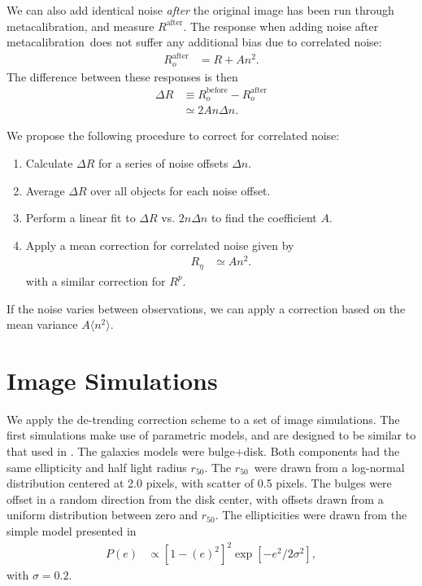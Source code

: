\documentclass[usegraphicx,usenatbib]{mn2e}
\newcommand{\hlr}{$r_{50}$}
\newcommand{\mcal}{metacalibration}
\newcommand{\mcalRpsf}{$R^{p}$}
\newcommand{\mcalRnoise}{$R_\eta$}
\begin{document}
We can also add identical noise {\em after} the original image  has been run
through \mcal, and measure $R^{\mathrm{after}}$.  The response when adding
noise after \mcal\ does not suffer any additional bias due to correlated noise:
\begin{align}
    R_o^{\mathrm{after}} &= R + A n^2.
\end{align}
The difference between these responses is then 
\begin{align}
    \Delta R &\equiv R_o^{\mathrm{before}} - R_o^{\mathrm{after}}  \nonumber \\
             &\simeq 2 A n \Delta n.
\end{align}

We propose the following procedure to correct for correlated noise:
\begin{enumerate}
    \item Calculate $\Delta R$ for a series of noise offsets $\Delta n$.
    \item Average $\Delta R$ over all objects for each noise offset.
    \item Perform a linear fit to $\Delta R$ vs. $2 n \Delta n$ to find the 
        coefficient $A$.
    \item Apply a mean correction for correlated noise given by
        \begin{align}
            \mbox{\mcalRnoise} & \simeq A n^2.
        \end{align}
        with a similar correction for \mcalRpsf.
\end{enumerate}
If the noise varies between observations, we can apply a 
correction based on the mean variance $A
\langle n^2 \rangle$.


\section{Image Simulations} \label{sec:sims}

We apply the de-trending correction scheme to a set of image simulations.  The
first simulations make use of parametric models, and are designed to be similar
to that used in \citet{bfd2015}.  The galaxies models were bulge+disk.  Both
components had the same ellipticity and half light radius \hlr. The \hlr\ were
drawn from a log-normal distribution centered at 2.0 pixels, with scatter of
0.5 pixels.  The bulges were offset in a random direction from the disk center, with
offsets drawn from a uniform distribution between zero and \hlr.  The
ellipticities were drawn from the simple model presented in \cite{ba14}
\begin{align}
    P(e) &\propto \left[1-(e)^2\right]^2 \exp\left[-e^2/2\sigma^2\right],
\end{align}
with $\sigma=0.2$.
\end{document}
